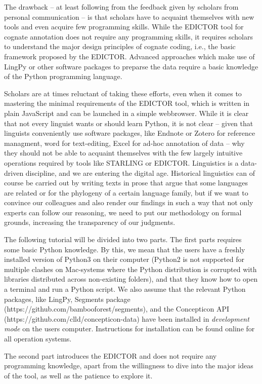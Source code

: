\documentclass[a4paper,svgnames]{scrartcl}
\begin{document}
The drawback -- at least following from the feedback given by scholars
from personal communication -- is that scholars have to acquaint
themselves with new tools and even acquire few programming skills. While
the EDICTOR tool for cognate annotation does not require any programming
skills, it requires scholars to understand the major design principles
of cognate coding, i.e., the basic framework proposed by the EDICTOR.
Advanced approaches which make use of LingPy or other software packages
to preparse the data require a basic knowledge of the Python programming
language.

Scholars are at times reluctant of taking these efforts, even when it
comes to mastering the minimal requirements of the EDICTOR tool, which
is written in plain JavaScript and can be launched in a simple
webbrowser. While it is clear that not every linguist wants or should
learn Python, it is not clear -- given that linguists conveniently use
software packages, like Endnote or Zotero for reference managment, word
for text-editing, Excel for ad-hoc annotation of data -- why they should
not be able to acquaint themselves with the few largely intuitive
operations required by tools like STARLING or EDICTOR. Linguistics is a
data-driven discipline, and we are entering the digital age. Historical
linguistics can of course be carried out by writing texts in prose that
argue that some languages are related or for the phylogeny of a certain
language family, but if we want to convince our colleagues and also
render our findings in such a way that not only experts can follow our
reasoning, we need to put our methodology on formal grounds, increasing
the transparency of our judgments.

The following tutorial will be divided into two parts. The first parts
requires some basic Python knowledge. By this, we mean that the users
have a freshly installed version of Python3 on their computer (Python2
is not supported for multiple clashes on Mac-systems where the Python
distribution is corrupted with libraries distributed across non-existing
folders), and that they know how to open a terminal and run a Python
script. We also assume that the relevant Python packages, like LingPy,
Segments package (https://github.com/bambooforest/segments), and the
Concepticon API (https://github.com/clld/concepticon-data) have been
installed in \emph{development mode} on the users computer. Instructions
for installation can be found online for all operation systems.

The second part introduces the EDICTOR and does not require any
programming knowledge, apart from the willingness to dive into the major
ideas of the tool, as well as the patience to explore it.
\end{document}
